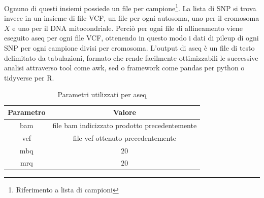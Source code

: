   Ognuno di questi insiemi possiede un file per campione\footnote{Riferimento a lista di campioni}.
  La lista di SNP si trova invece in un insieme di file VCF, un file per ogni autosoma, uno per il cromosoma $X$ e uno per il DNA mitocondriale.
  Perci\`o per ogni file di allineamento viene eseguito aseq per ogni file VCF, ottenendo in questo modo i dati di pileup di ogni SNP per ogni campione divisi per cromosoma.
  L'output di aseq \`e un file di testo delimitato da tabulazioni, formato che rende facilmente ottimizzabili le successive analisi attraverso tool come awk, sed o framework come pandas per python o tidyverse per R.
  \begin{table}[H]
        \begin{tabular}{|c|c|}
                \hline
                Parametro & Valore\\
                \hline
                bam & file bam indicizzato prodotto precedentemente\\
                \hline
                vcf & file vcf ottenuto precedentemente\\
                \hline
                mbq & $20$\\
                \hline
                mrq & $20$\\
                \hline
         \end{tabular}
         \centering
         \caption{Parametri utilizzati per aseq}
   \end{table}
  

